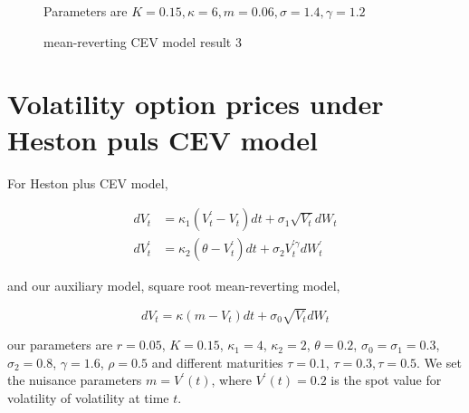 \begin{figure}[t]
  \hfill
  \caption{mean-reverting CEV model result 3}
  \small{Parameters are $K=0.15, \kappa=6, m=0.06, \sigma=1.4, \gamma=1.2$}
  \label{mrcev res3}
\end{figure}

\section{Volatility option prices under Heston puls CEV model}

For Heston plus CEV model,

$$
\begin{aligned}
  d V_t &=\kappa_1 \left(V^{\prime}_t - V_t\right) d t+\sigma_{1} \sqrt{V_t} d W_t \\
  d V^{\prime}_t &=\kappa_2\left(\theta -V^{\prime}_t\right) d t+\sigma_{2} V^{\prime \gamma}_t d W^{\prime}_t
\end{aligned}
$$

\noindent and our auxiliary model, square root mean-reverting model,

$$
d V_t=\kappa(m - V_t) d t+\sigma_0 \sqrt{V_t} d W_t
$$

\noindent our parameters are $r=0.05$, $K=0.15$, $\kappa_1=4$, $\kappa_2=2$, $\theta=0.2$, $\sigma_0=\sigma_1=0.3$, $\sigma_2=0.8$, $\gamma=1.6$, $\rho=0.5$ and different maturities $\tau=0.1$, $\tau=0.3, \tau=0.5$. We set the nuisance parameters $m= V^{\prime}(t)$, where $V^{\prime}(t)=0.2$ is the spot value for volatility of volatility at time $t$.

